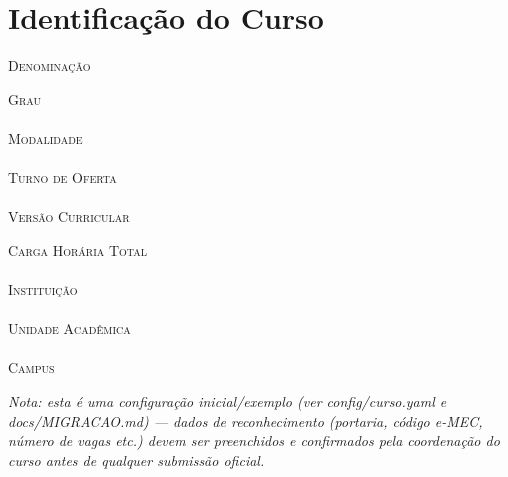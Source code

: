 \chapter{Identificação do Curso}

\begin{center}
\parbox{0.8\textwidth}{
    \textsc{\small \textcolor{AzulClaro}{Denominação}} \\ \hspace*{15mm} \textbf{\ppccurso}
}

\parbox{0.8\textwidth}{
    \textsc{\small \textcolor{AzulClaro}{Grau}} \\ \hspace*{15mm} \textbf{\ppcgrau}\\
    \textsc{\small \textcolor{AzulClaro}{Modalidade}} \\ \hspace*{15mm} \textbf{\ppcmodalidade}\\
    \textsc{\small \textcolor{AzulClaro}{Turno de Oferta}} \\ \hspace*{15mm} \textbf{\ppcturno}\\
    \textsc{\small \textcolor{AzulClaro}{Versão Curricular}} \\ \hspace*{15mm} \textbf{\ppcversao}
}

\parbox{0.8\textwidth}{
    \textsc{\small \textcolor{AzulClaro}{Carga Horária Total}} \\ \hspace*{15mm} \textbf{}\\
    \textsc{\small \textcolor{AzulClaro}{Instituição}} \\ \hspace*{15mm} \textbf{\ppcinstituicao}\\
    \textsc{\small \textcolor{AzulClaro}{Unidade Acadêmica}} \\ \hspace*{15mm} \textbf{\ppcunidadeacademica}\\
    \textsc{\small \textcolor{AzulClaro}{Campus}} \\ \hspace*{15mm} \textbf{\ppccampus}
}
\end{center}

\textit{Nota: esta é uma configuração inicial/exemplo (ver
config/curso.yaml e docs/MIGRACAO.md) — dados de reconhecimento (portaria,
código e-MEC, número de vagas etc.) devem ser preenchidos e confirmados pela
coordenação do curso antes de qualquer submissão oficial.}
